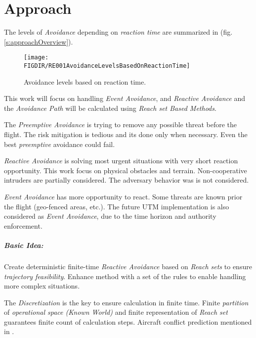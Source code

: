 \cleardoublepage
\chapter{Approach}\label{ch:approach}

\noindent The levels of \emph{Avoidance} depending on \emph{reaction time} are summarized in (fig. \ref{s:approachOverview}).

\begin{figure}[H]
    \centering
    \texttt{[image: \\FIGDIR/RE001AvoidanceLevelsBasedOnReactionTime]} 
    \caption{Avoidance levels based on reaction time.}
    \label{fig:AvoidanceLevels}
\end{figure}

\noindent This work will focus on handling \emph{Event Avoidance}, and \emph{Reactive Avoidance} and the \emph{Avoidance Path} will be calculated using \emph{Reach set Based Methods}. 

The \emph{Preemptive Avoidance} is trying to remove any possible threat before the flight. The risk mitigation is tedious and its done only when necessary. Even the best \emph{preemptive} avoidance could fail.

\emph{Reactive Avoidance} is solving most urgent situations with very short reaction opportunity. This work focus on physical obstacles and terrain. Non-cooperative intruders are partially considered. The adversary behavior was is not considered.

\emph{Event Avoidance} has more opportunity to react. Some threats are known prior the flight (geo-fenced areas, etc.). The future UTM implementation is also considered as \emph{Event Avoidance}, due to the time horizon and authority enforcement. 

\paragraph{Basic Idea:} Create deterministic finite-time \emph{Reactive Avoidance} based on \emph{Reach sets} to ensure \emph{trajectory feasibility}. Enhance method with a set of the rules to enable handling more complex situations.

The \emph{Discretization} is the key to ensure calculation in finite time. Finite \emph{partition} of \emph{operational space (Known World)} and finite representation of \emph{Reach set} guarantees finite count of calculation steps. Aircraft conflict prediction mentioned in \cite{prandini2008application}.

